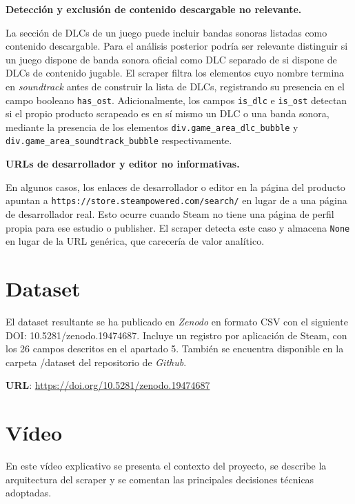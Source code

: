 \documentclass[
]{article}
\begin{document}
\vspace{0.2cm}
\textbf{Detección y exclusión de contenido descargable no relevante.}

La sección de DLCs de un juego puede incluir bandas sonoras listadas como contenido descargable. Para el análisis posterior podría ser relevante distinguir si un juego dispone de banda sonora oficial como DLC separado de si dispone de DLCs de contenido jugable. El scraper filtra los elementos cuyo nombre termina en \textit{soundtrack} antes de construir la lista de DLCs, registrando su presencia en el campo booleano \texttt{has\_ost}. Adicionalmente, los campos \texttt{is\_dlc} e \texttt{is\_ost} detectan si el propio producto scrapeado es en sí mismo un DLC o una banda sonora, mediante la presencia de los elementos \texttt{div.game\_area\_dlc\_bubble} y \texttt{div.game\_area\_soundtrack\_bubble} respectivamente.

\vspace{0.2cm}
\textbf{URLs de desarrollador y editor no informativas.}

En algunos casos, los enlaces de desarrollador o editor en la página del producto apuntan a \texttt{https://store.steampowered.com/search/} en lugar de a una página de desarrollador real. Esto ocurre cuando Steam no tiene una página de perfil propia para ese estudio o publisher. El scraper detecta este caso y almacena \texttt{None} en lugar de la URL genérica, que carecería de valor analítico.

\section{Dataset}\label{dataset}

El dataset resultante se ha publicado en \textit{Zenodo} en formato CSV con el siguiente DOI: 10.5281/zenodo.19474687. Incluye un registro por aplicación de Steam, con los 26 campos descritos en el apartado 5. También se encuentra disponible en la carpeta /dataset del repositorio de \textit{Github}.

\textbf{URL}: \url{https://doi.org/10.5281/zenodo.19474687}

\section{Vídeo}\label{vuxeddeo}

En este vídeo explicativo se presenta el contexto del proyecto, se describe la arquitectura del scraper y se comentan las principales decisiones técnicas adoptadas.
\end{document}
